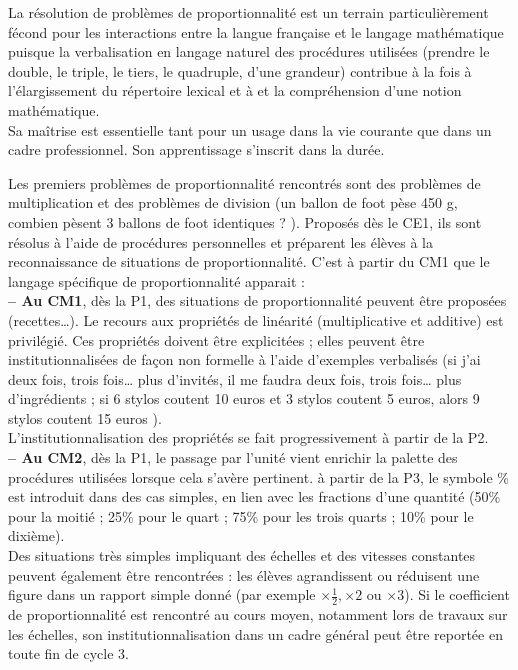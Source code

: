 La résolution de problèmes de proportionnalité est un terrain particulièrement fécond pour les interactions entre la langue française et le langage mathématique puisque la verbalisation en langage naturel des procédures utilisées (prendre le double, le triple, le tiers, le quadruple, d’une grandeur) contribue à la fois à l’élargissement du répertoire lexical et à et la compréhension d’une notion mathématique. \\
Sa maîtrise est essentielle tant pour un usage dans la vie courante que dans un cadre professionnel. Son apprentissage s’inscrit dans la durée. \medskip

Les premiers problèmes de proportionnalité rencontrés sont des problèmes de multiplication et des problèmes de division (\og un ballon de foot pèse 450 g, combien pèsent 3 ballons de foot identiques ? \fg). Proposés dès le CE1, ils sont résolus à l'aide de procédures personnelles et préparent les élèves à la reconnaissance de situations de proportionnalité. C'est à partir du CM1 que le langage spécifique de proportionnalité apparait : \\
{\bf -- Au CM1}, dès la P1, des situations de proportionnalité peuvent être proposées (recettes\dots). Le recours aux propriétés de linéarité (multiplicative et additive) est privilégié. Ces propriétés doivent être explicitées ; elles peuvent être institutionnalisées de façon non formelle à l’aide d’exemples verbalisés (\og si j’ai deux fois, trois fois… plus d’invités, il me faudra deux fois, trois fois… plus d’ingrédients \fg ; \og si 6 stylos coutent 10 euros et 3 stylos coutent 5 euros, alors 9 stylos coutent 15 euros \fg). \\
L'institutionnalisation des propriétés se fait progressivement à partir de la P2. \\
{\bf -- Au CM2}, dès la P1, le passage par l’unité vient enrichir la palette des procédures utilisées lorsque cela s’avère pertinent. à partir de la P3, le symbole \% est introduit dans des cas simples, en lien avec les fractions d’une quantité (50\% pour la moitié ; 25\% pour le quart ; 75\% pour les trois quarts ; 10\% pour le dixième). \\
Des situations très simples impliquant des échelles et des vitesses constantes peuvent également être rencontrées : les élèves agrandissent ou réduisent une figure dans un rapport simple donné (par exemple $\times\frac12, \times2$ ou $\times3$). Si le coefficient de proportionnalité est rencontré au cours moyen, notamment lors de travaux sur les échelles, son institutionnalisation dans un cadre général peut être reportée en toute fin de cycle 3. \\


